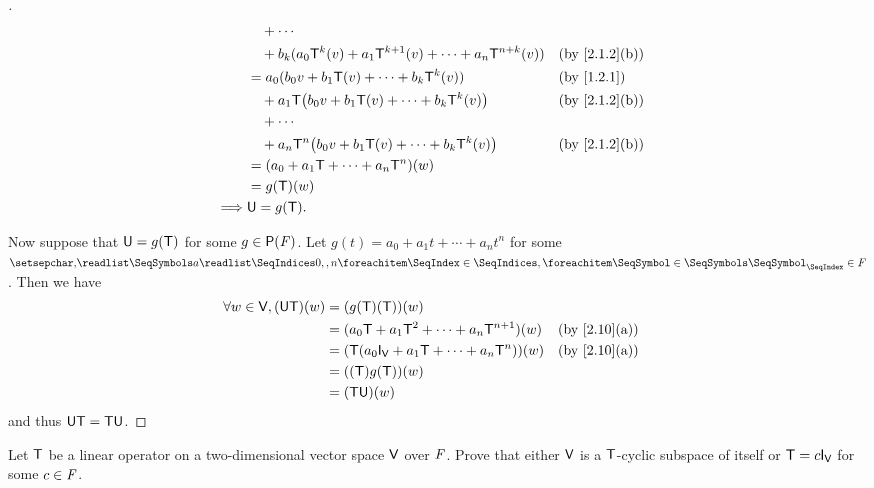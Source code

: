 \begin{proof}[]
\begin{align*}
             & \quad + \cdots                                                                                              \\
             & \quad + b_k (a_0 \T^k(v) + a_1 \T^{k + 1}(v) + \cdots + a_n \T^{n + k}(v)) &  & \text{(by \cref{2.1.2}(b))} \\
             & = a_0 (b_0 v + b_1 \T(v) + \cdots + b_k \T^k(v))                           &  & \text{(by \cref{1.2.1})}    \\
             & \quad + a_1 \T\pa{b_0 v + b_1 \T(v) + \cdots + b_k \T^k(v)}                &  & \text{(by \cref{2.1.2}(b))} \\
             & \quad + \cdots                                                                                              \\
             & \quad + a_n \T^n\pa{b_0 v + b_1 \T(v) + \cdots + b_k \T^k(v)}              &  & \text{(by \cref{2.1.2}(b))} \\
             & = (a_0 + a_1 \T + \cdots + a_n \T^n)(w)                                                                     \\
             & = g(\T)(w)                                                                                                  \\
    \implies & \U = g(\T).
  \end{align*}

  Now suppose that \(\mathsf{U} = g(\mathsf{T})\) for some \(g \in \ps{\F}\).
  Let \(g(t) = a_0 + a_1 t + \cdots + a_n t^n\) for some \(\seq{a}{0,,n} \in \F\).
  Then we have
  \begin{align*}
    \forall w \in \V, (\U \T)(w) & = (g(\T)(\T))(w)                                                                    \\
                                 & = (a_0 \T + a_1 \T^2 + \cdots + a_n \T^{n + 1})(w)  &  & \text{(by \cref{2.10}(a))} \\
                                 & = (\T(a_0 \IT[\V] + a_1 \T + \cdots + a_n \T^n))(w) &  & \text{(by \cref{2.10}(a))} \\
                                 & = ((\T) g(\T))(w)                                                                   \\
                                 & = (\T \U)(w)
  \end{align*}
  and thus \(\mathsf{U} \mathsf{T} = \mathsf{T} \mathsf{U}\).
\end{proof}

\begin{ex}\label{ex:5.4.21}
  Let \(\mathsf{T}\) be a linear operator on a two-dimensional vector space \(\mathsf{V}\) over \(\mathit{F}\).
  Prove that either \(\mathsf{V}\) is a \(\mathsf{T}\)-cyclic subspace of itself or \(\T = c \IT[\V]\) for some \(c \in \mathit{F}\).
\end{ex}

